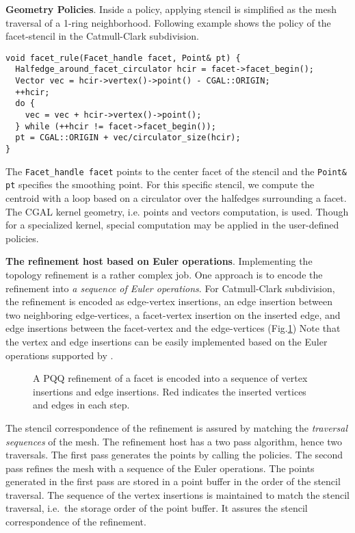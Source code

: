\noindent\textbf{Geometry Policies}.
Inside a policy, applying stencil is simplified as 
the mesh traversal of a 1-ring neighborhood. 
Following example shows the policy of the facet-stencil 
in the Catmull-Clark subdivision.
\begin{lstlisting}
void facet_rule(Facet_handle facet, Point& pt) {
  Halfedge_around_facet_circulator hcir = facet->facet_begin();
  Vector vec = hcir->vertex()->point() - CGAL::ORIGIN;
  ++hcir;
  do {
    vec = vec + hcir->vertex()->point();
  } while (++hcir != facet->facet_begin());
  pt = CGAL::ORIGIN + vec/circulator_size(hcir);
}
\end{lstlisting}
The \lstinline!Facet_handle facet! points to the 
center facet of the stencil and the \lstinline!Point& pt! 
specifies the smoothing point. For this specific stencil, 
we compute the centroid with a loop based on a circulator 
over the halfedges surrounding a facet. The CGAL kernel 
geometry, i.e. points and vectors computation, is used. 
Though for a specialized kernel, special computation may be 
applied in the user-defined policies.
 
\noindent\textbf{The refinement host based on Euler operations}.
Implementing the topology refinement is a rather complex job. One
approach is to encode the refinement into \emph{a sequence of Euler
operations}. For Catmull-Clark subdivision, the refinement is encoded
as edge-vertex insertions, an edge insertion between two neighboring
edge-vertices, a facet-vertex insertion on the inserted edge, and 
edge insertions between the facet-vertex and the edge-vertices 
(Fig.\ref{fig:CCRefinement}) 
Note that the vertex and edge insertions can be easily 
implemented based on the Euler operations supported by \cgalpoly.
\begin{figure}
  \centering
  \caption{A PQQ refinement of a facet is encoded into a sequence of
  vertex insertions and edge insertions. Red indicates the inserted
  vertices and edges in each step.}
  \label{fig:CCRefinement}
\end{figure}

The stencil correspondence of the refinement is assured
by matching the \emph{traversal sequences} of the mesh. 
The refinement host has a two pass algorithm, hence two 
traversals. The first pass generates the points by 
calling the policies. The second pass
refines the mesh with a sequence of the Euler operations.
The points generated in the first pass are stored in a
point buffer in the order of the stencil 
traversal. The sequence of the vertex insertions 
is maintained to match the stencil traversal, i.e.\ 
the storage order of the point buffer. It assures 
the stencil correspondence of the refinement.

